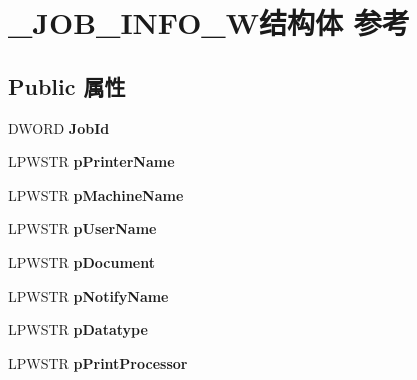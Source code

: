 \hypertarget{struct___j_o_b___i_n_f_o__2_w}{}\section{\+\_\+\+J\+O\+B\+\_\+\+I\+N\+F\+O\+\_\+W结构体 参考}
\label{struct___j_o_b___i_n_f_o__2_w}
\subsection*{Public 属性}
\begin{DoxyCompactItemize}
\item 
\mbox{\label{struct___j_o_b___i_n_f_o__2_w_a7bae11d15b634b6164ef63e46f8ff081}} 
D\+W\+O\+RD {\bfseries Job\+Id}
\item 
\mbox{\label{struct___j_o_b___i_n_f_o__2_w_ad44283a006c213df124915a8db58f684}} 
L\+P\+W\+S\+TR {\bfseries p\+Printer\+Name}
\item 
\mbox{\label{struct___j_o_b___i_n_f_o__2_w_abfc88fa316101ca170c131504f109db3}} 
L\+P\+W\+S\+TR {\bfseries p\+Machine\+Name}
\item 
\mbox{\label{struct___j_o_b___i_n_f_o__2_w_ac27bd707234eea041f656acd3aaba5e6}} 
L\+P\+W\+S\+TR {\bfseries p\+User\+Name}
\item 
\mbox{\label{struct___j_o_b___i_n_f_o__2_w_a92908aea0039a74715d68dd75211b644}} 
L\+P\+W\+S\+TR {\bfseries p\+Document}
\item 
\mbox{\label{struct___j_o_b___i_n_f_o__2_w_ae27d929dcc71ca7a603260dd5e05bb93}} 
L\+P\+W\+S\+TR {\bfseries p\+Notify\+Name}
\item 
\mbox{\label{struct___j_o_b___i_n_f_o__2_w_aa6cc86e42b142fafe900c233b6ddbaef}} 
L\+P\+W\+S\+TR {\bfseries p\+Datatype}
\item 
\mbox{\label{struct___j_o_b___i_n_f_o__2_w_a7d9f207be4ed8d153587d7f3158c19c4}} 
L\+P\+W\+S\+TR {\bfseries p\+Print\+Processor}

\end{DoxyCompactItemize}
